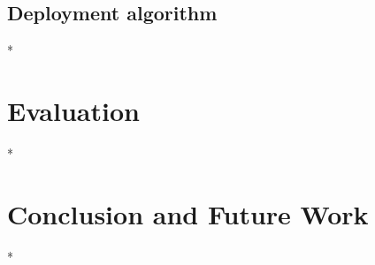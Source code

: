 \documentclass[letterpaper,10pt,conference]{ieeeconf}
\theoremstyle{definition}
\begin{document}


\subsection{Deployment algorithm}

*

\section{Evaluation}
\label{sec:experimental}

*

\section{Conclusion and Future Work}
\label{sec:conclusion}

*


 
\vspace{0.1ex}

\newpage
\end{document}
